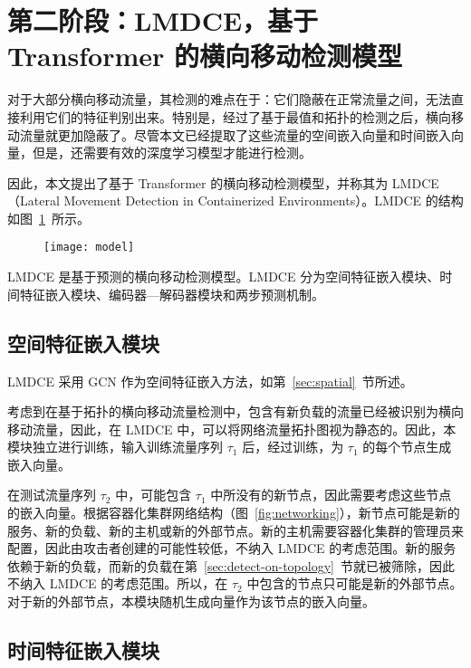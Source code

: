 {\section{第二阶段：LMDCE，基于 Transformer 的横向移动检测模型}

对于大部分横向移动流量，其检测的难点在于：它们隐蔽在正常流量之间，无法直接利用它们的特征判别出来。特别是，经过了基于最值和拓扑的检测之后，横向移动流量就更加隐蔽了。尽管本文已经提取了这些流量的空间嵌入向量和时间嵌入向量，但是，还需要有效的深度学习模型才能进行检测。

因此，本文提出了基于 Transformer 的横向移动检测模型，并称其为 LMDCE（Lateral Movement Detection in Containerized Environments）。LMDCE 的结构如图~\ref{fig:model}~所示。

\begin{figure}[t]
    \centering
    \texttt{[image: model]}
    \label{fig:model}

\end{figure}

LMDCE 是基于预测的横向移动检测模型。LMDCE 分为空间特征嵌入模块、时间特征嵌入模块、编码器—解码器模块和两步预测机制。

\subsection{空间特征嵌入模块}

LMDCE 采用 GCN 作为空间特征嵌入方法，如第~\ref{sec:spatial}~节所述。

考虑到在基于拓扑的横向移动流量检测中，包含有新负载的流量已经被识别为横向移动流量，因此，在 LMDCE 中，可以将网络流量拓扑图视为静态的。因此，本模块独立进行训练，输入训练流量序列 $\tau_1$ 后，经过训练，为 $\tau_1$ 的每个节点生成嵌入向量。

在测试流量序列 $\tau_2$ 中，可能包含 $\tau_1$ 中所没有的新节点，因此需要考虑这些节点的嵌入向量。根据容器化集群网络结构（图~\ref{fig:networking}），新节点可能是新的服务、新的负载、新的主机或新的外部节点。新的主机需要容器化集群的管理员来配置，因此由攻击者创建的可能性较低，不纳入 LMDCE 的考虑范围。新的服务依赖于新的负载，而新的负载在第~\ref{sec:detect-on-topology}~节就已被筛除，因此不纳入 LMDCE 的考虑范围。所以，在 $\tau_2$ 中包含的节点只可能是新的外部节点。对于新的外部节点，本模块随机生成向量作为该节点的嵌入向量。

\subsection{时间特征嵌入模块}
\label{sec:temporal-module}

}
